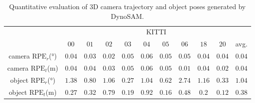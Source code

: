 
\begin{table}[t]
\footnotesize
\centering
\setlength{\tabcolsep}{2.0pt}
\caption{\small{Quantitative evaluation of 3D camera trajectory and object poses generated by DynoSAM.}}
\label{tab:estimation_results}
\begin{tabular}{c|ccccccccc|c}
\toprule
 & \multicolumn{10}{c}{KITTI} \\
 & $00$ & $01$ & $02$ & $03$ & $04$ & $05$ & $06$ & $18$ & $20$ & avg.  \\
\midrule
\midrule
camera $\text{RPE}_r$(\si{\degree}) & $0.04$ & $0.03$ & $0.02$ & $0.05$ & $0.06$ & $0.05$ & $0.05$ & $0.04$ & $0.04$ & $0.04$  \\
\midrule
camera $\text{RPE}_t$(\si{\meter}) & $0.04$ & $0.04$ & $0.03$ & $0.05$ & $0.06$ & $0.05$ & $0.01$ & $0.04$ & $0.02$ & $0.04$\\
\midrule
\midrule
object $\text{RPE}_r$(\si{\degree}) & $1.38$ & $0.80$ & $1.06$ & $0.27$ & $1.04$ & $0.62$ & $2.74$ & $1.16$ & $0.33$ & $1.04$  \\
\midrule
object $\text{RPE}_t$(\si{\meter}) & $0.27$ & $0.32$ & $0.79$ & $0.19$ & $0.92$ & $0.16$ & $0.48$ & $0.2$ & $0.12$ & $0.38$\\
\bottomrule
\end{tabular}
\vspace{-2mm}
\end{table}
